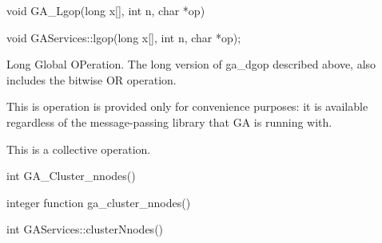 \documentclass[12pt]{article}
\begin{document}

\begin{capi}
\begin{ccode}
void GA_Lgop(long x[], int n, char *op)
\end{ccode}
\begin{funcargs}
\end{funcargs}
\end{capi}

\begin{cxxapi}
\begin{cxxcode}
void GAServices::lgop(long x[], int n, char *op);
\end{cxxcode}
\begin{funcargs}
\end{funcargs}
\end{cxxapi}
\wcoll

\begin{desc}

Long Global OPeration. The long version of ga_dgop described above, 
also includes the bitwise OR operation.

This is operation is provided only for convenience purposes: it is 
available regardless of the message-passing library that GA is running with.

This is a collective operation.
\end{desc}


\begin{capi}
\begin{ccode}
int GA_Cluster_nnodes()
\end{ccode}
\end{capi}

\begin{fapi}
\begin{fcode}
integer function ga_cluster_nnodes()
\end{fcode}
\end{fapi}

\begin{cxxapi}
\begin{cxxcode}
int GAServices::clusterNnodes()
\end{cxxcode}
\end{cxxapi}
\end{document}
